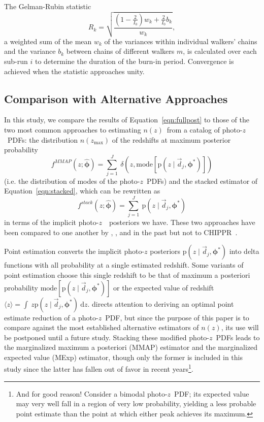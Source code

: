 \documentclass[iop]{emulateapj}
\newcommand{\Eq}[1]{Equation~\ref{#1}}
\newcommand{\project}[1]{{\textsc{#1}}~}
\newcommand{\Chippr}{\project{CHIPPR}}
\newcommand{\nz}{$n(z)$}
\newcommand{\data}{\ensuremath{\vec{d}}}
\newcommand{\pr}[1]{\ensuremath{\mathrm{p}(#1)}}
\newcommand{\gvn}{\mid}%
\newcommand{\integral}[2]{\ensuremath{\int\ #1\ \mathrm{d} #2}}
\newcommand{\pz}{photo-$z$~}
\newcommand{\pzpdf}{\pz PDF}
\newcommand{\bvec}[1]{{\ensuremath{\boldsymbol{#1}}}}
\newcommand{\ndphi}{\bvec{\phi}}
\begin{document}
The Gelman-Rubin statistic
\begin{equation}
\label{eqn:gr}
R_{k} = \sqrt{\frac{(1 - \frac{2}{I_{0}}) w_{k} + \frac{2}{I_{0}} 
b_{k}}{w_{k}}},
\end{equation}
a weighted sum of the mean $w_{k}$ of the variances within individual walkers' 
chains and the variance $b_{k}$ between chains of different walkers $m$, is 
calculated over each sub-run $i$ to determine the duration of the burn-in 
period.  
Convergence is achieved when the statistic approaches unity.  

\subsection{Comparison with Alternative Approaches}
\label{sec:sheldon}

In this study, we compare the results of \Eq{eqn:fullpost} to those of the two 
most common approaches to estimating \nz\ from a catalog of \pzpdf s: the 
distribution $n(z_{\mathrm{max}})$ of the redshifts at maximum posterior 
probability
\begin{equation}
\label{eqn:mmap}
f^{MMAP}(z; \hat{\ndphi}) = \sum_{j=1}^{J}\ \delta(z, \mathrm{mode}[\pr{z \gvn 
\data_{j}, \ndphi^{*}}])
\end{equation}
(i.e. the distribution of modes of the \pzpdf s) and the stacked estimator of 
\Eq{eqn:stacked}, which can be rewritten as 
\begin{equation}
\label{eqn:stacked}
f^{stack}(z; \hat{\ndphi}) = \sum_{j=1}^{J}\ \pr{z \gvn \data_{j}, \ndphi^{*}}
\end{equation}
in terms of the implicit \pz\ posteriors we have.
These two approaches have been compared to one another by 
\citet{Hildebrandt2012}, \citet{Benjamin2013}, and \citet{Asorey2016} in the 
past but not to \Chippr.

Point estimation converts the implicit photo-$z$ posteriors $\pr{z \gvn 
\data_{j}, \ndphi^{*}}$ into delta functions with all probability at a single 
estimated redshift.  
Some variants of point estimation choose this single redshift to be that of 
maximum a posteriori probability $\mathrm{mode}[\pr{z \gvn \data_{j}, 
\ndphi^{*}}]$ or the expected value of redshift $\langle z \rangle = 
\integral{z \pr{z \gvn \data_{j}, \ndphi^{*}}}{z}$.
\citet{tanaka_photometric_2018} directs attention to deriving an optimal point 
estimate reduction of a \pzpdf, but since the purpose of this paper is to 
compare against the most established alternative estimators of \nz, its use 
will be postponed until a future study.
Stacking these modified \pzpdf s leads to the marginalized maximum a posteriori 
(MMAP) estimator and the marginalized expected value (MExp) estimator, though 
only the former is included in this study since the latter has fallen out of 
favor in recent years\footnote{And for good reason!  Consider a bimodal \pzpdf; 
its expected value may very well fall in a region of very low probability, 
yielding a less probable point estimate than the point at which either peak 
achieves its maximum.}.
\end{document}
